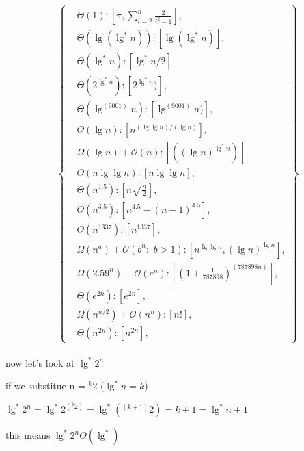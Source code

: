 \documentclass[11pt,fleqn]{article}
\theoremstyle{definition}
\theoremstyle{remark}
\begin{document}
\[
\left\{
\begin{aligned}
& \Theta(1): [\pi, \sum_{i=2}^{n} \frac{2}{i^2 - 1}],\\
& \Theta(\lg(\lg^*n)): [\lg(\lg^*n)],\\
& \Theta(\lg^* n): [\lg^* n/2]\\
& \Theta(2^{\lg^*n}): [2^{\lg^*n})],\\
& \Theta(\lg^{(9001)} n): [\lg^{(9001)} n)],\\
& \Theta(\lg n): [n^{({\lg \lg n})/({\lg n})}],\\
& \Omega(\lg n) + \mathcal{O}(n): [({(\lg n)}^{\lg^*{n}})],\\
& \Theta(n\lg \lg n): [n\lg \lg n],\\
& \Theta(n^{1.5}): [n\sqrt{\frac{n}{2}}],\\
& \Theta(n^{3.5}): [n^{4.5} - (n - 1)^{4.5}],\\ 
& \Theta(n^{1337}): [n^{1337}],\\
& \Omega(n^a) + \mathcal{O}(b^n:\,\, b > 1): [n^{\lg \lg n}, (\lg n)^{\lg n}],\\
& \Omega(2.59^n) + \mathcal{O}(e^n): [{(1 + \frac{1}{787898})}^{(787898n)}],\\
& \Theta(e^{2n}): [e^{2n}],\\
& \Omega(n^{n/2}) + \mathcal{O}(n^n): [n!],\\
& \Theta(n^{2n}): [n^{2n}],
\end{aligned}
\right\}
\]\\

now let's look at $\lg^* 2^n$

if we substitue n = ${}^k 2$ ($\lg^* n = k$)

$\lg^* 2^n = \lg^* 2^{({}^k 2)} = \lg^* ({}^{(k+1)} 2) = k + 1 = \lg^* n + 1$

this means $\lg^* 2^n \Theta(\lg^*)$
\end{document}
